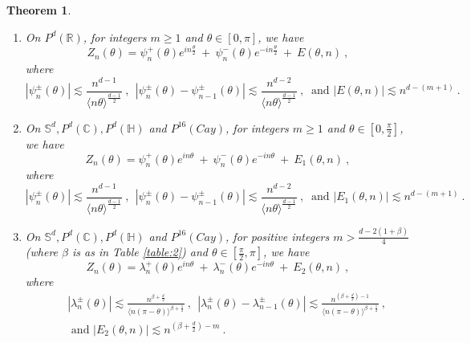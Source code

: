 \documentclass[12pt]{amsart}
\newtheorem{theorem}{Theorem}[section]
\theoremstyle{definition}
\newcommand{\R}{\mathbb R}%
\newcommand{\C}{\mathbb C}%
\newcommand{\Sb}{\mathbb S}%
\newcommand{\Hb}{\mathbb H}%
\numberwithin{equation}{section}
\begin{document}
\begin{theorem} \label{thm_oscillatory_zn}
\begin{enumerate}
\item \label{part1} On $P^d(\R)$, for integers $m \ge 1$ and $\theta \in [0,\pi]$, we have
\begin{equation*}
Z_n(\theta)=\psi^+_n(\theta)e^{in\frac{\theta}{2}}\:+\:\psi^-_n(\theta)e^{-in\frac{\theta}{2}}\:+\:E(\theta,n)\:,
\end{equation*}
where
\begin{equation*}
\left|\psi^\pm_n(\theta)\right|\lesssim \frac{n^{d-1}}{\langle n \theta \rangle^{\frac{d-1}{2}}}\:,\:\: \left|\psi^\pm_n(\theta)-\psi^\pm_{n-1}(\theta)\right|\lesssim \frac{n^{d-2}}{\langle n \theta \rangle^{\frac{d-1}{2}}}\:,\:\text{ and } \left|E(\theta,n)\right| \lesssim n^{d-(m+1)}\:. 
\end{equation*}
\item \label{part2} On $\Sb^d,P^d(\C),P^d(\Hb)$ and $P^{16}(Cay)$, for  integers  $m \ge 1$ and $\theta \in \left[0,\frac{\pi}{2}\right]$, we have
\begin{equation*}
Z_n(\theta)=\psi^+_n(\theta)e^{in\theta}\:+\:\psi^-_n(\theta)e^{-in\theta}\:+\:E_1(\theta,n)\:,
\end{equation*}
where
\begin{equation*}
\left|\psi^\pm_n(\theta)\right|\lesssim \frac{n^{d-1}}{\langle n \theta \rangle^{\frac{d-1}{2}}}\:,\:\: \left|\psi^\pm_n(\theta)-\psi^\pm_{n-1}(\theta)\right|\lesssim \frac{n^{d-2}}{\langle n \theta \rangle^{\frac{d-1}{2}}}\:,\:\text{ and } \left|E_1(\theta,n)\right| \lesssim n^{d-(m+1)}\:. 
\end{equation*}
\item \label{part3} On $\Sb^d,P^d(\C),P^d(\Hb)$ and $P^{16}(Cay)$, for  positive integers $m >\frac{d-2(1+\beta)}{4}$ (where $\beta$ is as in Table \ref{table:2}) and $\theta \in \left[\frac{\pi}{2},\pi\right]$, we have
\begin{equation*}
Z_n(\theta)=\lambda^+_n(\theta)e^{in\theta}\:+\:\lambda^-_n(\theta)e^{-in\theta}\:+\:E_2(\theta,n)\:,
\end{equation*}
where
\begin{eqnarray*}
&&\left|\lambda^\pm_n(\theta)\right|\lesssim \frac{n^{\beta + \frac{d}{2}}}{\langle n (\pi-\theta) \rangle^{\beta + \frac{1}{2}}}\:,\:\: \left|\lambda^\pm_n(\theta)-\lambda^\pm_{n-1}(\theta)\right|\lesssim \frac{n^{\left(\beta + \frac{d}{2}\right)-1}}{\langle n (\pi-\theta) \rangle^{\beta + \frac{1}{2}}}\:,\\
&&\text{ and } \left|E_2(\theta,n)\right| \lesssim n^{\left(\beta + \frac{d}{2}\right)-m}\:. 
\end{eqnarray*}
\end{enumerate}
\end{theorem}
\end{document}
